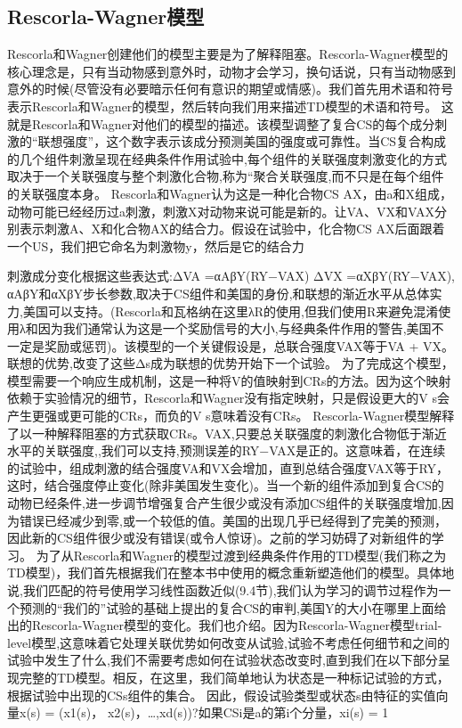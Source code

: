 \subsection{Rescorla-Wagner模型}

Rescorla和Wagner创建他们的模型主要是为了解释阻塞。Rescorla-Wagner模型的核心理念是，只有当动物感到意外时，动物才会学习，换句话说，只有当动物感到意外的时候(尽管没有必要暗示任何有意识的期望或情感)。我们首先用术语和符号表示Rescorla和Wagner的模型，然后转向我们用来描述TD模型的术语和符号。
这就是Rescorla和Wagner对他们的模型的描述。该模型调整了复合CS的每个成分刺激的“联想强度”，这个数字表示该成分预测美国的强度或可靠性。当CS复合构成的几个组件刺激呈现在经典条件作用试验中,每个组件的关联强度刺激变化的方式取决于一个关联强度与整个刺激化合物,称为“聚合关联强度,而不只是在每个组件的关联强度本身。
Rescorla和Wagner认为这是一种化合物CS AX，由a和X组成，动物可能已经经历过a刺激，刺激X对动物来说可能是新的。让VA、VX和VAX分别表示刺激A、X和化合物AX的结合力。假设在试验中，化合物CS AX后面跟着一个US，我们把它命名为刺激物y，然后是它的结合力

刺激成分变化根据这些表达式:ΔVA =αAβY(RY−VAX)
ΔVX =αXβY(RY−VAX),
αAβY和αXβY步长参数,取决于CS组件和美国的身份,和联想的渐近水平从总体实力,美国可以支持。(Rescorla和瓦格纳在这里λR的使用,但我们使用R来避免混淆使用λ和因为我们通常认为这是一个奖励信号的大小,与经典条件作用的警告,美国不一定是奖励或惩罚)。该模型的一个关键假设是，总联合强度VAX等于VA + VX。联想的优势,改变了这些Δs成为联想的优势开始下一个试验。
为了完成这个模型，模型需要一个响应生成机制，这是一种将V的值映射到CRs的方法。因为这个映射依赖于实验情况的细节，Rescorla和Wagner没有指定映射，只是假设更大的V s会产生更强或更可能的CRs，而负的V s意味着没有CRs。
Rescorla-Wagner模型解释了以一种解释阻塞的方式获取CRs。VAX,只要总关联强度的刺激化合物低于渐近水平的关联强度,,我们可以支持,预测误差的RY−VAX是正的。这意味着，在连续的试验中，组成刺激的结合强度VA和VX会增加，直到总结合强度VAX等于RY，这时，结合强度停止变化(除非美国发生变化)。当一个新的组件添加到复合CS的动物已经条件,进一步调节增强复合产生很少或没有添加CS组件的关联强度增加,因为错误已经减少到零,或一个较低的值。美国的出现几乎已经得到了完美的预测，因此新的CS组件很少或没有错误(或令人惊讶)。之前的学习妨碍了对新组件的学习。
为了从Rescorla和Wagner的模型过渡到经典条件作用的TD模型(我们称之为TD模型)，我们首先根据我们在整本书中使用的概念重新塑造他们的模型。具体地说,我们匹配的符号使用学习线性函数近似(9.4节),我们认为学习的调节过程作为一个预测的“我们的”试验的基础上提出的复合CS的审判,美国Y的大小在哪里上面给出的Rescorla-Wagner模型的变化。我们也介绍。因为Rescorla-Wagner模型trial-level模型,这意味着它处理关联优势如何改变从试验,试验不考虑任何细节和之间的试验中发生了什么,我们不需要考虑如何在试验状态改变时,直到我们在以下部分呈现完整的TD模型。相反，在这里，我们简单地认为状态是一种标记试验的方式，根据试验中出现的CSs组件的集合。
因此，假设试验类型或状态s由特征的实值向量x(s) = (x1(s)， x2(s)，…,xd(s))?如果CSi是a的第i个分量，xi(s) = 1

